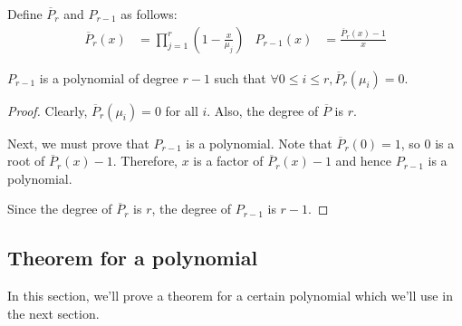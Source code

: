 Define $\overline{P}_r$ and $P_{r-1}$ as follows:
\begin{align*}
\overline{P}_r(x) &= \prod_{j=1}^r \left( 1 - \frac{x}{\mu_j} \right)
& P_{r-1}(x) &= \frac{\overline{P}_r(x)-1}{x}
\end{align*}

\begin{lemma}
\label{thm:p-is-poly}
$P_{r-1}$ is a polynomial of degree $r-1$ such that $\forall 0 \le i \le r, \overline{P}_r(\mu_i) = 0$.
\end{lemma}
\begin{proof}
Clearly, $\overline{P}_r(\mu_i) = 0$ for all $i$. Also, the degree of $\overline{P}$ is $r$.

Next, we must prove that $P_{r-1}$ is a polynomial.
Note that $\overline{P}_r(0) = 1$, so $0$ is a root of $\overline{P}_r(x) - 1$.
Therefore, $x$ is a factor of $\overline{P}_r(x)-1$
and hence $P_{r-1}$ is a polynomial.

Since the degree of $\overline{P}_r$ is $r$, the degree of $P_{r-1}$ is $r-1$.
\end{proof}

\subsection{Theorem for a polynomial}

In this section, we'll prove a theorem for a certain polynomial which we'll use in the next section.

